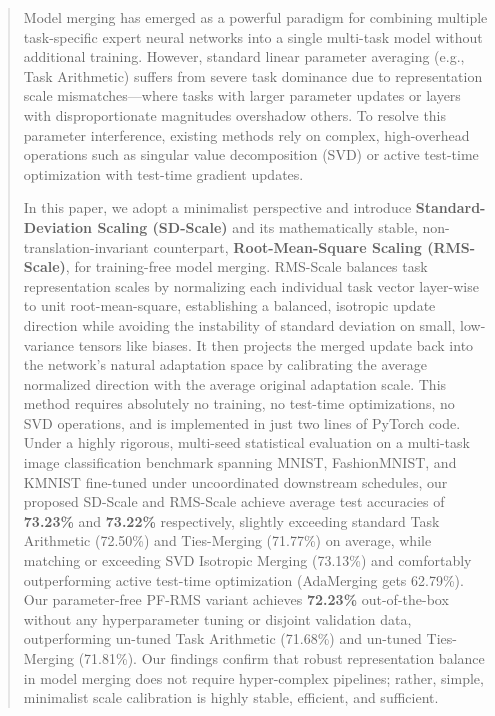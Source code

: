 \begin{abstract}
Model merging has emerged as a powerful paradigm for combining multiple task-specific expert neural networks into a single multi-task model without additional training. However, standard linear parameter averaging (e.g., Task Arithmetic) suffers from severe task dominance due to representation scale mismatches—where tasks with larger parameter updates or layers with disproportionate magnitudes overshadow others. To resolve this parameter interference, existing methods rely on complex, high-overhead operations such as singular value decomposition (SVD) or active test-time optimization with test-time gradient updates. 

In this paper, we adopt a minimalist perspective and introduce \textbf{Standard-Deviation Scaling (SD-Scale)} and its mathematically stable, non-translation-invariant counterpart, \textbf{Root-Mean-Square Scaling (RMS-Scale)}, for training-free model merging. RMS-Scale balances task representation scales by normalizing each individual task vector layer-wise to unit root-mean-square, establishing a balanced, isotropic update direction while avoiding the instability of standard deviation on small, low-variance tensors like biases. It then projects the merged update back into the network's natural adaptation space by calibrating the average normalized direction with the average original adaptation scale. This method requires absolutely no training, no test-time optimizations, no SVD operations, and is implemented in just two lines of PyTorch code. Under a highly rigorous, multi-seed statistical evaluation on a multi-task image classification benchmark spanning MNIST, FashionMNIST, and KMNIST fine-tuned under uncoordinated downstream schedules, our proposed SD-Scale and RMS-Scale achieve average test accuracies of \textbf{73.23\%} and \textbf{73.22\%} respectively, slightly exceeding standard Task Arithmetic (72.50\%) and Ties-Merging (71.77\%) on average, while matching or exceeding SVD Isotropic Merging (73.13\%) and comfortably outperforming active test-time optimization (AdaMerging gets 62.79\%). Our parameter-free PF-RMS variant achieves \textbf{72.23\%} out-of-the-box without any hyperparameter tuning or disjoint validation data, outperforming un-tuned Task Arithmetic (71.68\%) and un-tuned Ties-Merging (71.81\%). Our findings confirm that robust representation balance in model merging does not require hyper-complex pipelines; rather, simple, minimalist scale calibration is highly stable, efficient, and sufficient.
\end{abstract}

